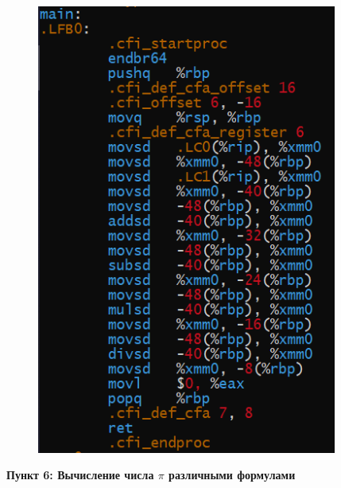 \documentclass[a4paper,12pt]{article}
\begin{document}
\begin{figure}[H]
{\begin{minipage}[t]{0.4\textwidth}
        \includegraphics[width = 0.88\textwidth]{Операции double листинг.png}
    \end{minipage}}
\end{figure}

\textbf{Пункт 6: Вычисление числа $\pi$ различными формулами}
\end{document}
